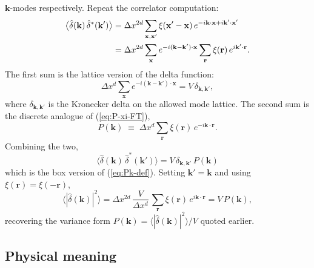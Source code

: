 \documentclass[12pt]{article}
\begin{document}
$\mathbf k$-modes respectively. Repeat the correlator computation:
\begin{align}
  \bigl\langle\hat\delta(\mathbf k)\,\hat\delta^*(\mathbf k')\bigr\rangle
  &= \Delta x^{2d}\sum_{\mathbf x,\mathbf x'}
     \xi(\mathbf x'-\mathbf x)\,
     e^{-i\mathbf k\cdot\mathbf x+i\mathbf k'\cdot\mathbf x'} \notag\\
  &= \Delta x^{2d}\sum_{\mathbf x}e^{-i(\mathbf k-\mathbf k')\cdot\mathbf x}
     \sum_{\mathbf r}\xi(\mathbf r)\,e^{i\mathbf k'\cdot\mathbf r}.
\end{align}
The first sum is the lattice version of the delta function:
\begin{equation*}
  \Delta x^d\sum_{\mathbf x}e^{-i(\mathbf k-\mathbf k')\cdot\mathbf x}
  = V\,\delta_{\mathbf k,\mathbf k'},
\end{equation*}
where $\delta_{\mathbf k,\mathbf k'}$ is the Kronecker delta on the
allowed mode lattice. The second sum is the discrete analogue of
(\ref{eq:P-xi-FT}),
\begin{equation*}
  P(\mathbf k) \;\equiv\; \Delta x^d\sum_{\mathbf r}\xi(\mathbf r)\,
    e^{-i\mathbf k\cdot\mathbf r}.
\end{equation*}
Combining the two,
\begin{equation}\label{eq:Pk-discrete}
  \boxed{\;\bigl\langle\hat\delta(\mathbf k)\,\hat\delta^*(\mathbf k')\bigr\rangle
  = V\,\delta_{\mathbf k,\mathbf k'}\,P(\mathbf k)\;}
\end{equation}
which is the box version of (\ref{eq:Pk-def}). Setting $\mathbf
k'=\mathbf k$ and using $\xi(\mathbf r)=\xi(-\mathbf r)$,
\begin{equation*}
\bigl\langle|\hat\delta(\mathbf k)|^2\bigr\rangle
  = \Delta x^{2d}\,\frac{V}{\Delta x^d}\,\sum_{\mathbf r}\xi(\mathbf r)\,e^{i\mathbf k\cdot\mathbf r}
   = V\,P(\mathbf k),
\end{equation*}
recovering the variance form $P(\mathbf k) =
\langle|\hat\delta(\mathbf k)|^2\rangle/V$ quoted earlier.

\subsection*{Physical meaning}
\end{document}
